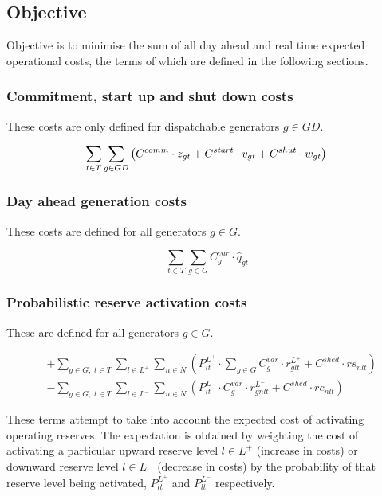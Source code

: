 \documentclass[number,times]{elsarticle}
\begin{document}
\subsection{Objective}

Objective is to minimise the sum of all day ahead and real time expected operational costs, the terms of which are defined in the following sections.

\subsubsection{Commitment, start up and shut down costs}

These costs are only defined for dispatchable generators $g \in GD$.

\begin{equation}
    \sum_{t \in T} \sum_{g \in GD} \left ( C^{comm} \cdot z_{gt} + C^{start} \cdot v_{gt} + C^{shut} \cdot w_{gt} \right ) \\
\end{equation}

\subsubsection{Day ahead generation costs}

These costs are defined for all generators $g \in G$.

\begin{equation}
    \sum_{t \in T} \sum_{g \in G} C^{var}_{g} \cdot \hat{q}_{gt}
\end{equation}

\subsubsection{Probabilistic reserve activation costs}

These are defined for all generators $g \in G$.

\begin{align}
     & + \sum_{g \in G, \; t \in T} \sum_{l \in L^+} \sum_{n \in N} \left ( P^{L^+}_{lt} \cdot \sum_{g \in G} C^{var}_{g} \cdot r^{L^+}_{glt} + C^{shed} \cdot rs_{nlt} \right ) \\
     & - \sum_{g \in G, \; t \in T} \sum_{l \in L^-} \sum_{n \in N} \left ( P^{L^-}_{lt} \cdot C^{var}_{g} \cdot r^{L^-}_{gnlt} + C^{shed} \cdot rc_{nlt} \right ) \nonumber
\end{align}

These terms attempt to take into account the expected cost of activating operating reserves. The expectation is obtained by weighting the cost of activating a particular upward reserve level $l \in L^+$ (increase in costs) or downward reserve level $l \in L^-$ (decrease in costs) by the probability of that reserve level being activated, $P^{L^+}_{lt}$ and $P^{L^-}_{lt}$ respectively.
\end{document}
